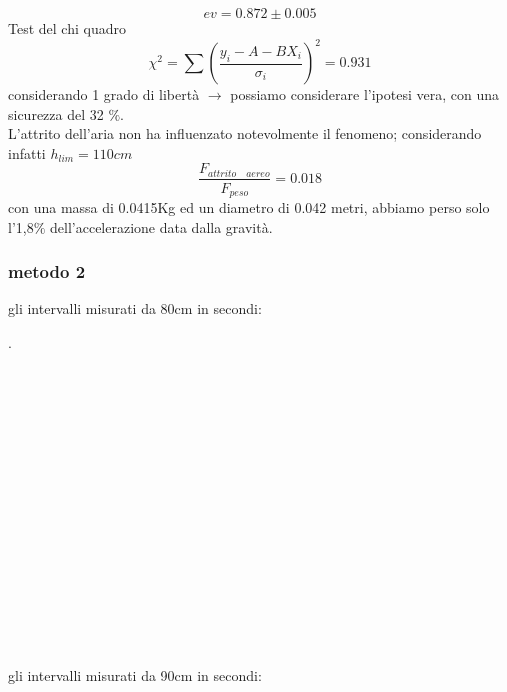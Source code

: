 \documentclass[a4paper]{article}
\theoremstyle{definition}
\begin{document}
	\[ev = 0.872 \pm 0.005\]
\noindent Test del chi quadro\\
\[\chi ^{2} = \sum \left ( \frac{y_{i}-A-BX_{i}}{\sigma_{i}} \right )^{2} = 0.931\]
\noindent considerando 1 grado di libertà \(\rightarrow \)  possiamo considerare l'ipotesi vera, con una sicurezza del 32 \(\%\).\\
L'attrito dell'aria non ha influenzato notevolmente il fenomeno; considerando infatti \(h_{lim} = 110 cm\)
\[\frac{F_{attrito \quad aereo}}{F_{peso}} = 0.018\]
con una massa di 0.0415Kg ed un diametro di 0.042 metri, abbiamo perso solo l'1,8\(\%\) dell'accelerazione data dalla gravità.
	\subsubsection*{metodo 2}
	gli intervalli misurati da 80cm in secondi:
	\begin{figure}[!h]
	\end{figure}
	.\\\\\\\\\\\\\\\\\\\\\\\\\\\\\\\\\\
	\noindent gli intervalli misurati da 90cm in secondi:
\end{document}
